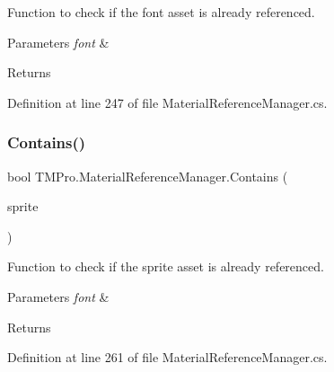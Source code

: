 Function to check if the font asset is already referenced. 


\begin{DoxyParams}{Parameters}
{\em font} & \\
\hline
\end{DoxyParams}
\begin{DoxyReturn}{Returns}

\end{DoxyReturn}


Definition at line 247 of file Material\+Reference\+Manager.\+cs.

\mbox{\label{class_t_m_pro_1_1_material_reference_manager_a900e5d78f7716ac071050558f4f838fa}} 
\subsubsection{\texorpdfstring{Contains()}{Contains()}\hspace{0.1cm}{\footnotesize\ttfamily [2/2]}}
{\footnotesize\ttfamily bool T\+M\+Pro.\+Material\+Reference\+Manager.\+Contains (\begin{DoxyParamCaption}\item[{\mbox{\hyperlink{class_t_m_pro_1_1_t_m_p___sprite_asset}{T\+M\+P\+\_\+\+Sprite\+Asset}}}]{sprite }\end{DoxyParamCaption})}



Function to check if the sprite asset is already referenced. 


\begin{DoxyParams}{Parameters}
{\em font} & \\
\hline
\end{DoxyParams}
\begin{DoxyReturn}{Returns}

\end{DoxyReturn}


Definition at line 261 of file Material\+Reference\+Manager.\+cs.

\mbox{\label{class_t_m_pro_1_1_material_reference_manager_a61de4a348042d6714254fd9558f8f632}} 
